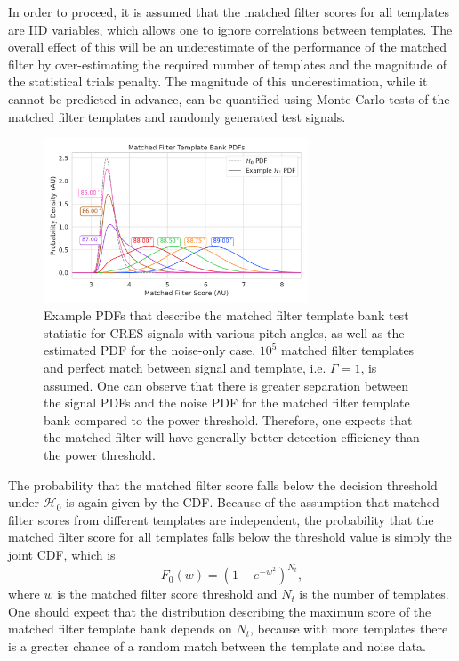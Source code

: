 In order to proceed, it is assumed that the matched filter scores for all templates are IID variables, which allows one to ignore correlations between templates. The overall effect of this will be an underestimate of the performance of the matched filter by over-estimating the required number of templates and the magnitude of the statistical trials penalty. The magnitude of this underestimation, while it cannot be predicted in advance, can be quantified using Monte-Carlo tests of the matched filter templates and randomly generated test signals.

\begin{figure}[htbp]
    \centering
    \includegraphics[width=0.7\textwidth]{figs/Chapter-4/230915_mf_pdf_by_pitch.png}
    \caption{Example PDFs that describe the matched filter template bank test statistic for CRES signals with various pitch angles, as well as the estimated PDF for the noise-only case. $10^5$ matched filter templates and perfect match between signal and template, i.e. $\Gamma=1$, is assumed. One can observe that there is greater separation between the signal PDFs and the noise PDF for the matched filter template bank compared to the power threshold. Therefore, one expects that the matched filter will have generally better detection efficiency than the power threshold.}
    \label{fig:mf_pdf}
\end{figure}

The probability that the matched filter score falls below the decision threshold under $\mathcal{H}_0$ is again given by the CDF. Because of the assumption that matched filter scores from different templates are independent, the probability that the matched filter score for all templates falls below the threshold value is simply the joint CDF, which is
\begin{equation}
    F_{0}(w) = \left(1-e^{-w^2}\right)^{N_t},
    \label{eq:mf_joint_cdf_0}
\end{equation}
where $w$ is the matched filter score threshold and $N_t$ is the number of templates. One should expect that the distribution describing the maximum score of the matched filter template bank depends on $N_t$, because with more templates there is a greater chance of a random match between the template and noise data.

